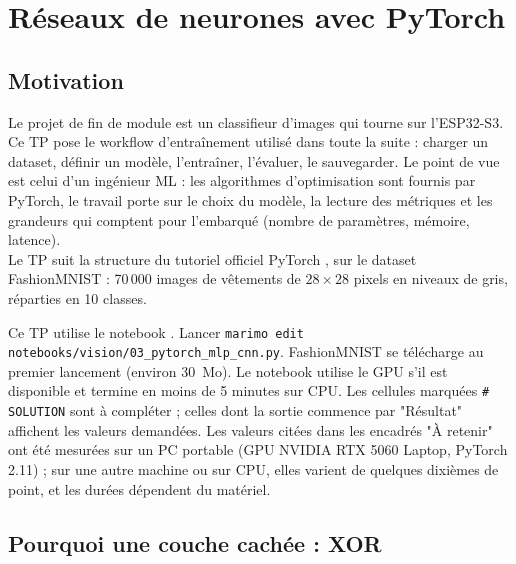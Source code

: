 
\chapter{Réseaux de neurones avec PyTorch}

\section*{Motivation}

Le projet de fin de module est un classifieur d'images qui tourne sur l'ESP32-S3. Ce TP pose le workflow d'entraînement utilisé dans toute la suite : charger un dataset, définir un modèle, l'entraîner, l'évaluer, le sauvegarder. Le point de vue est celui d'un ingénieur ML : les algorithmes d'optimisation sont fournis par PyTorch, le travail porte sur le choix du modèle, la lecture des métriques et les grandeurs qui comptent pour l'embarqué (nombre de paramètres, mémoire, latence). \\

Le TP suit la structure du tutoriel officiel PyTorch \cite{pytorch}, sur le dataset FashionMNIST : 70\,000 images de vêtements de $28 \times 28$ pixels en niveaux de gris, réparties en 10 classes. \\

\begin{imp}
Ce TP utilise le notebook . Lancer \texttt{marimo edit notebooks/vision/03\_pytorch\_mlp\_cnn.py}. FashionMNIST se télécharge au premier lancement (environ 30~Mo). Le notebook utilise le GPU s'il est disponible et termine en moins de 5 minutes sur CPU. Les cellules marquées \texttt{\# SOLUTION} sont à compléter ; celles dont la sortie commence par "Résultat" affichent les valeurs demandées.
Les valeurs citées dans les encadrés "À retenir" ont été mesurées sur un PC portable (GPU NVIDIA RTX 5060 Laptop, PyTorch 2.11) ; sur une autre machine ou sur CPU, elles varient de quelques dixièmes de point, et les durées dépendent du matériel.
\end{imp}

\section{Pourquoi une couche cachée : XOR}


